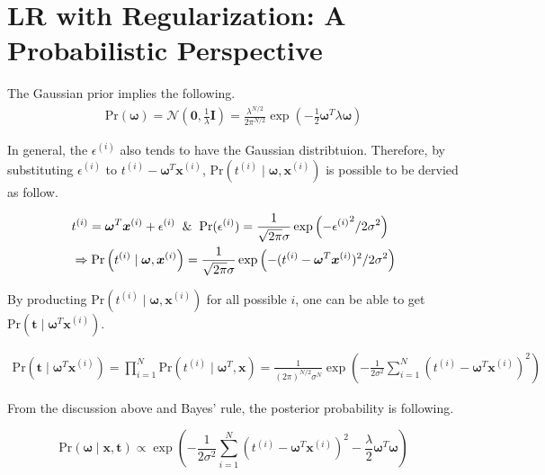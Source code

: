 \documentclass[12pt]{article}
\begin{document}
\section{LR with Regularization: A Probabilistic Perspective}
The Gaussian prior implies the following.
\begin{align*}
    \text{Pr}(\boldsymbol{\omega}) = \mathcal{N}(\boldsymbol{0},\frac{1}{\lambda} \boldsymbol{I}) = \frac{\lambda^{N/2}}{2\pi^{N/2}}\exp\left({-\frac{1}{2}\boldsymbol{\omega}^T \lambda \boldsymbol{\omega}}\right)
\end{align*}

\noindent
In general, the $\epsilon^{(i)}$ also tends to have the Gaussian distribtuion. Therefore, by substituting $\epsilon^{(i)}$ to $t^{(i)} - \boldsymbol{\omega}^T \boldsymbol{x}^{(i)}$, $\text{Pr}\left(t^{(i)}\;|\;\boldsymbol{\omega}, \boldsymbol{x}^{(i)}\right)$ is possible to be dervied as follow.

\begin{align*}
    &t^{(i)} = \boldsymbol{\omega}^T \boldsymbol{x}^{(i)} + \epsilon^{(i)} \And
    \text{Pr}(\epsilon^{(i)}) = \frac{1}{\sqrt{2\pi}\sigma}\exp\left( -{\epsilon^{(i)}}^2/2\sigma^2\right) \\ &\Rightarrow \text{Pr}\left(t^{(i)}\;|\;\boldsymbol{\omega}, \boldsymbol{x}^{(i)}\right) = \frac{1}{\sqrt{2\pi}\sigma} \exp\left(-(t^{(i)} - \boldsymbol{\omega}^T\boldsymbol{x}^{(i)})^2/2\sigma^2\right)
\end{align*}

By producting $\text{Pr}\left(t^{(i)}\;|\;\boldsymbol{\omega}, \boldsymbol{x}^{(i)}\right)$ for all possible $i$, one can be able to get $\text{Pr}(\boldsymbol{t}\;|\; \boldsymbol{\omega}^T \boldsymbol{x}^{(i)})$.

\begin{align*}
    \text{Pr}(\boldsymbol{t}\;|\; \boldsymbol{\omega}^T \boldsymbol{x}^{(i)}) = \prod_{i=1}^N\text{Pr}(t^{(i)}\;|\;\boldsymbol{\omega}^T, \boldsymbol{x}) = \frac{1}{(2\pi)^{N/2}\sigma^N} \exp\left(-\frac{1}{2\sigma^2}\sum_{i=1}^N (t^{(i)} - \boldsymbol{\omega}^T \boldsymbol{x}^{(i)})^2\right)
\end{align*}

From the discussion above and Bayes' rule, the posterior probability is following. 

\begin{equation}
    \text{Pr}(\boldsymbol{\omega}\;|\;\boldsymbol{x},\boldsymbol{t}) \propto \exp\left(-\frac{1}{2\sigma^2} \sum_{i=1}^N \left(t^{(i)} - \boldsymbol{\omega}^T\boldsymbol{x}^{(i)} \right)^2 - \frac{\lambda}{2} \boldsymbol{\omega}^T\boldsymbol{\omega}\right)
    \label{eqn:pos}
\end{equation}
\end{document}
